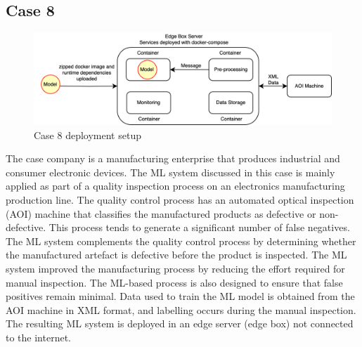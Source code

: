 \subsection*{Case 8} %
\label{case: 8}

\begin{figure}[b]
\centering
\includegraphics[width=\linewidth]{images/case8_deployment_process.png}
\caption{Case 8 deployment setup}
\label{fig: case8_deployment_process}
\end{figure}


The case company is a manufacturing enterprise that produces industrial and consumer electronic devices. The ML system discussed in this case is mainly applied as part of a quality inspection process on an electronics manufacturing production line. The quality control process has an automated optical inspection (AOI) machine that classifies the manufactured products as defective or non-defective. This process tends to generate a significant number of false negatives. The ML system complements the quality control process by determining whether the manufactured artefact is defective before the product is inspected. The ML system improved the manufacturing process by reducing the effort required for manual inspection. The ML-based process is also designed to ensure that false positives remain minimal. Data used to train the ML model is obtained from the AOI machine in XML format, and labelling occurs during the manual inspection. The resulting ML system is deployed in an edge server (edge box) not connected to the internet.
 


